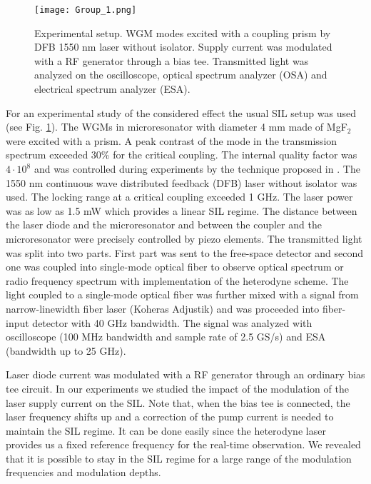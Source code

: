 \documentclass[a4paper, amsfonts, amssymb, amsmath, reprint, showkeys, nofootinbib, twoside,longbibliography, aps]{revtex4-1}
\begin{document}
\begin{figure}[hbtp!]
\centering
\texttt{[image: Group\_1.png]}
\caption{Experimental setup. WGM modes excited with a coupling prism by DFB  1550 nm laser without isolator. Supply current was modulated with a RF generator through a bias tee. Transmitted light was analyzed on the oscilloscope, optical spectrum analyzer (OSA) and electrical spectrum analyzer (ESA). }
\label{fig:Setup}
\end{figure}



For an experimental study of the considered effect the usual SIL setup was used (see Fig. \ref{fig:Setup}). The WGMs in microresonator with diameter 4 mm made of MgF$_{2}$ were excited with a prism. A peak contrast of the mode in the transmission spectrum exceeded 30\% for the critical coupling. The internal quality factor was $4\cdot10^8$ and was controlled during experiments by the technique proposed in \cite{shitikov2020microresonator}. The 1550 nm continuous wave distributed feedback (DFB) laser without isolator was used. The locking range at a critical coupling exceeded 1 GHz. The laser power was as low as 1.5 mW which provides a linear SIL regime. The distance between the laser diode and the microresonator and between the coupler and the microresonator were precisely controlled by piezo elements. The transmitted light was split into two parts. First part was sent to the free-space detector and second one was coupled into single-mode optical fiber to observe optical spectrum or radio frequency spectrum with implementation of the heterodyne scheme.
The light coupled to a single-mode optical fiber was further mixed with a signal from narrow-linewidth fiber laser (Koheras Adjustik) and was proceeded into fiber-input detector with 40 GHz bandwidth. The signal was analyzed with oscilloscope (100 MHz bandwidth and sample rate of 2.5 GS/s) and ESA (bandwidth up to 25 GHz). 




Laser diode current was modulated with a RF generator through an ordinary bias tee circuit. In our experiments we studied the impact of the modulation of the laser supply current on the SIL. Note that, when the bias tee is connected, the laser frequency shifts up and a correction of the pump current is needed to maintain the SIL regime. It can be done easily since the heterodyne laser provides us a fixed reference frequency for the real-time observation. We revealed that it is possible to stay in the SIL regime for a large range of the modulation frequencies and modulation depths. %
\end{document}

